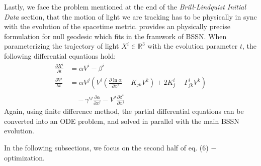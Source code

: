 \documentclass[conference]{IEEEtran}
\begin{document}
Lastly, we face the problem mentioned at the end of the \textit{Brill-Lindquist Initial Data} 
section, that the motion of light we are tracking has to be 
physically in sync with the evolution of the spacetime metric. 
\cite{3_1Geo} provides an physically precise formulation for null 
geodesic which fits in the framwork of BSSN. When parameterizing the 
trajectory of light $X^i \in \mathbb{R}^3$ with the evolution parameter $t$, the following 
differential equations hold:
\begin{align*}
\frac{\partial X^i}{\partial t} &= \alpha V^i - \beta^i \\
\frac{\partial V^i}{\partial t} &= \alpha V^j \left(V^i\left(\frac{\partial \ln\alpha}{\partial x^j} - 
K_{jk}V^k\right) + 2K^i_j - \Gamma^i_{jk}V^k\right) \\
& \quad -\gamma^{ij}\frac{\partial \alpha}{\partial x^j} - V^j \frac{\partial \beta^i}{\partial x^j}
\end{align*}
Again, using finite difference method, the partial differential equations 
can be converted into an ODE problem, and solved in parallel with 
the main BSSN evolution.

In the following subsections, we focus on the second half of eq. (6) $-$ optimization.
\end{document}
